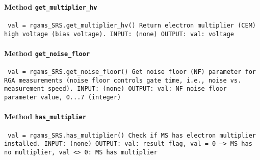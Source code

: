 \paragraph{Method \texttt{get_multiplier_hv}}
\vspace{1ex}
\texttt{\newline
val = rgams_SRS.get_multiplier_hv()\newline
\newline
Return electron multiplier (CEM) high voltage (bias voltage).\newline
\newline
INPUT:\newline
(none)\newline
\newline
OUTPUT:\newline
val: voltage\newline
\newline
}

\paragraph{Method \texttt{get_noise_floor}}
\vspace{1ex}
\texttt{\newline
val = rgams_SRS.get_noise_floor()\newline
\newline
Get noise floor (NF) parameter for RGA measurements (noise floor controls gate time, i.e., noise vs. measurement speed).\newline
\newline
INPUT:\newline
(none)\newline
\newline
OUTPUT:\newline
val: NF noise floor parameter value, 0...7 (integer)\newline
\newline
}

\paragraph{Method \texttt{has_multiplier}}
\vspace{1ex}
\texttt{\newline
val = rgams_SRS.has_multiplier()\newline
\newline
Check if MS has electron multiplier installed.\newline
\newline
INPUT:\newline
(none)\newline
\newline
OUTPUT:\newline
val: result flag, val = 0 --> MS has no multiplier, val <> 0: MS has multiplier\newline
\newline
}

